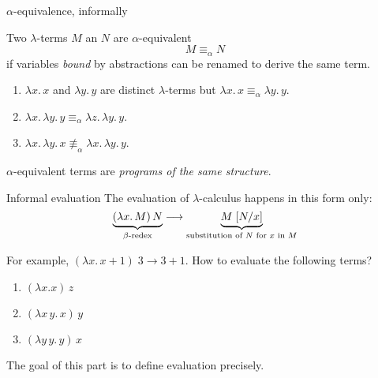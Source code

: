 \begin{frame}{$\alpha$-equivalence, informally}
  \begin{definition}
    Two $\lambda$-terms $M$ an $N$ are \alert{$\alpha$-equivalent} 
    \[
      M \equiv_\alpha N
    \]
    if variables \emph{bound} by abstractions can be renamed to derive the same term. 
  \end{definition}
  \begin{example}
    \begin{enumerate}
      \item $\lambda x.\, x$ and $\lambda y.\, y$ are distinct $\lambda$-terms but $\lambda x.\, x
        \equiv_\alpha \lambda y.\, y$. 
      \item $\lambda x.\, \lambda y.\, y \equiv_\alpha 
        \lambda z.\, \lambda y.\, y$. 
      \item $\lambda x.\, \lambda y.\, x \mathrel{\not\equiv}_\alpha
        \lambda x.\, \lambda y.\, y$. 
    \end{enumerate}
  \end{example}
  $\alpha$-equivalent terms are \emph{programs of the same structure}.
  
\end{frame}

\begin{frame}{Informal evaluation}
  The \alert{evaluation} of $\lambda$-calculus happens in this form only:
  \[
    \underbrace{(\lambda x.\, M)\,N}_{\beta\text{-redex}} \longrightarrow 
    \underbrace{M\;[{N}/{x}]}_{\text{substitution of $N$ for $x$ in $M$}}
  \]

  For example, $(\lambda x.\, x +1)\;3 \to 3 + 1$.
  How to evaluate the following terms? 
  \begin{enumerate}
    \item $(\lambda x.x)\,z$
    \item $(\lambda x\, y.\,x)\,y$
    \item $(\lambda y\, y.\,y)\,x$
  \end{enumerate}
  The goal of this part is to define evaluation precisely. 

\end{frame}

